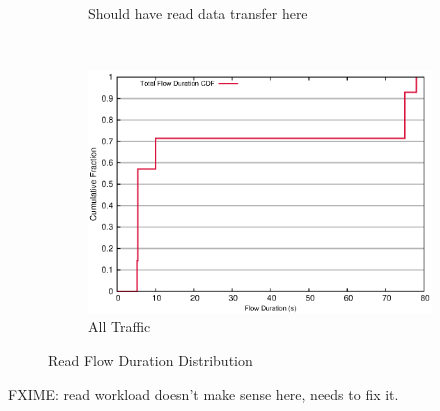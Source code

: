 \begin{figure}[!htpb]
\begin{subfigure}[b]{.45\linewidth}
	\caption{Should have read data transfer here}\label{fig:read_duration:fixme}
   \end{subfigure} \\%
  \begin{subfigure}[b]{.55\linewidth}
   \centering
	\includegraphics[width=.99\textwidth]{figures/4read/flow_duration.eps}
	\caption{All Traffic}\label{fig:read_duration:all}
   \end{subfigure}%
\caption{Read Flow Duration Distribution}
\end{figure}

FXIME: read workload doesn't make sense here, needs to fix it.


